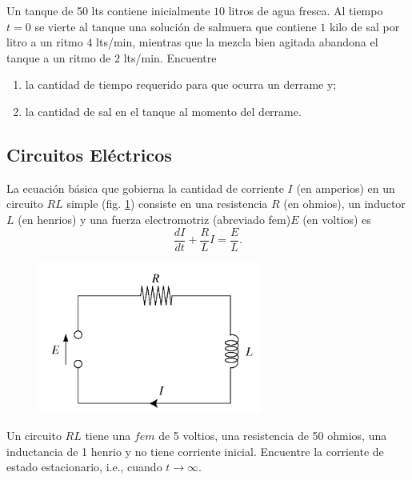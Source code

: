 	\begin{problema}
		Un tanque de 50 lts contiene inicialmente $10$ litros de agua fresca. Al tiempo $t=0$ se vierte al tanque una solución de salmuera que contiene $1$ kilo de sal por litro a un ritmo $4$ lts/min, mientras que la mezcla bien agitada abandona el tanque a un ritmo de $2$ lts/min. Encuentre
		\begin{enumerate}
			\item la cantidad de tiempo requerido para que ocurra un derrame y;
			\item la cantidad de sal en el tanque al momento del derrame.
		\end{enumerate}
		
	\end{problema}
	



\subsection{Circuitos Eléctricos}


	La ecuación básica que gobierna la cantidad de corriente $I$ (en amperios) en un circuito $RL$ simple (fig. \ref{fig:020502}) consiste en una resistencia $R$ (en ohmios), un inductor $L$ (en henrios) y una fuerza electromotriz (abreviado fem)$E$ (en voltios) es
	\[
		\label{bron:7.9}
		\dfrac{dI}{dt}+\dfrac{R}{L}I=\dfrac{E}{L}.
	\]
	



	\begin{figure}
		\centering
		\includegraphics[height=5cm,keepaspectratio=true]{./edo/img020502.png}
		\label{fig:020502}
	\end{figure}
	



	\begin{problema}
		Un circuito $RL$ tiene una $fem$ de 5 voltios, una resistencia de 50 ohmios, una inductancia de 1 henrio y no tiene corriente inicial. Encuentre la corriente de estado estacionario, i.e., cuando $t\to \infty.$
	\end{problema}
	



